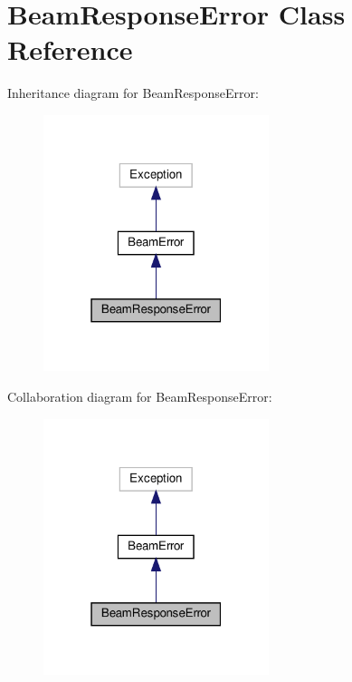 \hypertarget{classpewpewlaz0rt4nk_1_1_beam_response_error}{}\section{Beam\+Response\+Error Class Reference}
\label{classpewpewlaz0rt4nk_1_1_beam_response_error}


Inheritance diagram for Beam\+Response\+Error\+:
\nopagebreak
\begin{figure}[H]
\begin{center}
\leavevmode
\includegraphics[width=187pt]{classpewpewlaz0rt4nk_1_1_beam_response_error__inherit__graph}
\end{center}
\end{figure}


Collaboration diagram for Beam\+Response\+Error\+:
\nopagebreak
\begin{figure}[H]
\begin{center}
\leavevmode
\includegraphics[width=187pt]{classpewpewlaz0rt4nk_1_1_beam_response_error__coll__graph}
\end{center}
\end{figure}


